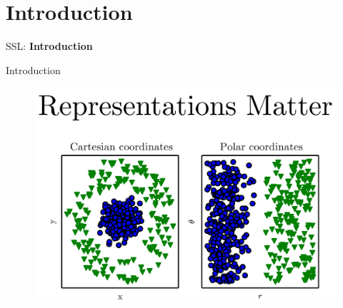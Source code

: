 \section{Introduction}
\begin{frame}{}
    \LARGE SSL: \textbf{Introduction}
\end{frame}

\begin{frame}[allowframebreaks]{Introduction}
    \begin{figure}
        \centering
        \includegraphics[width=\linewidth,height=0.9\textheight,keepaspectratio]{images/ssl/slide_2_1_img.png}
    \end{figure}

    \framebreak


\end{frame}
